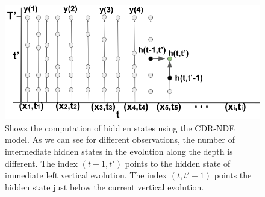 \documentclass{article} %
\begin{document}
\begin{figure}[t]
  \begin{center}
    \includegraphics[scale=0.4]{figures/drawings17.png}
  \end{center}
  \caption{ Shows the computation of hidd   en states using the CDR-NDE model. As we can see for different observations, the number of intermediate hidden states in the evolution along the depth is different. The index $(t-1,t')$ points to the hidden state of immediate left vertical evolution. The index $(t,t'-1)$ points the hidden state just below the current vertical evolution. }
  \label{fig:deep-gru-ode}
  \end{figure}
\end{document}
